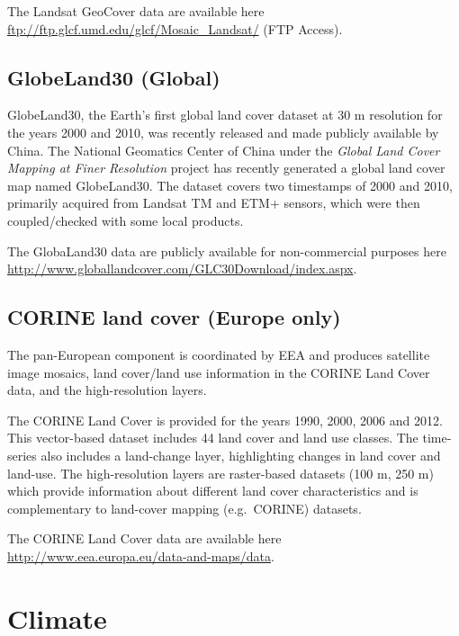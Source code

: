 \documentclass[10pt,b5paper,]{book}
\theoremstyle{definition}
\theoremstyle{definition}
\theoremstyle{definition}
\theoremstyle{remark}
\begin{document}
The Landsat GeoCover data are available here
\url{ftp://ftp.glcf.umd.edu/glcf/Mosaic_Landsat/} (FTP Access).

\hypertarget{globeland30-global}{%
\subsection{GlobeLand30 (Global)}\label{globeland30-global}}

GlobeLand30, the Earth's first global land cover dataset at 30 m
resolution for the years 2000 and 2010, was recently released and made
publicly available by China. The National Geomatics Center of China
under the \emph{Global Land Cover Mapping at Finer Resolution} project
has recently generated a global land cover map named GlobeLand30. The
dataset covers two timestamps of 2000 and 2010, primarily acquired from
Landsat TM and ETM+ sensors, which were then coupled/checked with some
local products.

The GlobaLand30 data are publicly available for non-commercial purposes
here \url{http://www.globallandcover.com/GLC30Download/index.aspx}.

\hypertarget{corine-land-cover-europe-only}{%
\subsection{CORINE land cover (Europe
only)}\label{corine-land-cover-europe-only}}

The pan-European component is coordinated by EEA and produces satellite
image mosaics, land cover/land use information in the CORINE Land Cover
data, and the high-resolution layers.

The CORINE Land Cover is provided for the years 1990, 2000, 2006 and
2012. This vector-based dataset includes 44 land cover and land use
classes. The time-series also includes a land-change layer, highlighting
changes in land cover and land-use. The high-resolution layers are
raster-based datasets (100 m, 250 m) which provide information about
different land cover characteristics and is complementary to land-cover
mapping (e.g.~CORINE) datasets.

The CORINE Land Cover data are available here
\url{http://www.eea.europa.eu/data-and-maps/data}.

\hypertarget{climate}{%
\section{Climate}\label{climate}}
\end{document}
